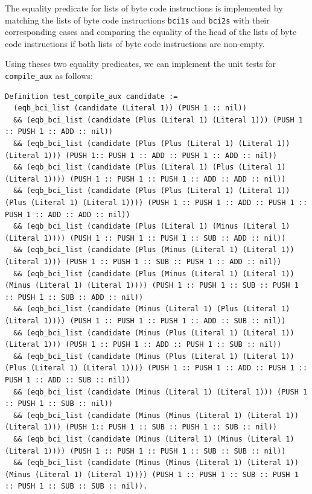 \documentclass{article}
\begin{document}
The equality predicate for lists of byte code instructions is implemented by matching the lists of byte code instructions \texttt{bci1s} and \texttt{bci2s} with their corresponding cases and comparing the equality of the head of the lists of byte code instructions if both lists of byte code instructions are non-empty.

Using theses two equality predicates, we can implement the unit tests for \texttt{compile\_aux} as follows:

\begin{lstlisting}
Definition test_compile_aux candidate :=
  (eqb_bci_list (candidate (Literal 1)) (PUSH 1 :: nil))
  && (eqb_bci_list (candidate (Plus (Literal 1) (Literal 1))) (PUSH 1 :: PUSH 1 :: ADD :: nil))
  && (eqb_bci_list (candidate (Plus (Plus (Literal 1) (Literal 1)) (Literal 1))) (PUSH 1:: PUSH 1 :: ADD :: PUSH 1 :: ADD :: nil))
  && (eqb_bci_list (candidate (Plus (Literal 1) (Plus (Literal 1) (Literal 1)))) (PUSH 1 :: PUSH 1 :: PUSH 1 :: ADD :: ADD :: nil))
  && (eqb_bci_list (candidate (Plus (Plus (Literal 1) (Literal 1)) (Plus (Literal 1) (Literal 1)))) (PUSH 1 :: PUSH 1 :: ADD :: PUSH 1 :: PUSH 1 :: ADD :: ADD :: nil))
  && (eqb_bci_list (candidate (Plus (Literal 1) (Minus (Literal 1) (Literal 1)))) (PUSH 1 :: PUSH 1 :: PUSH 1 :: SUB :: ADD :: nil))
  && (eqb_bci_list (candidate (Plus (Minus (Literal 1) (Literal 1)) (Literal 1))) (PUSH 1 :: PUSH 1 :: SUB :: PUSH 1 :: ADD :: nil))
  && (eqb_bci_list (candidate (Plus (Minus (Literal 1) (Literal 1)) (Minus (Literal 1) (Literal 1)))) (PUSH 1 :: PUSH 1 :: SUB :: PUSH 1 :: PUSH 1 :: SUB :: ADD :: nil))
  && (eqb_bci_list (candidate (Minus (Literal 1) (Plus (Literal 1) (Literal 1)))) (PUSH 1 :: PUSH 1 :: PUSH 1 :: ADD :: SUB :: nil))
  && (eqb_bci_list (candidate (Minus (Plus (Literal 1) (Literal 1)) (Literal 1))) (PUSH 1 :: PUSH 1 :: ADD :: PUSH 1 :: SUB :: nil))
  && (eqb_bci_list (candidate (Minus (Plus (Literal 1) (Literal 1)) (Plus (Literal 1) (Literal 1)))) (PUSH 1 :: PUSH 1 :: ADD :: PUSH 1 :: PUSH 1 :: ADD :: SUB :: nil))
  && (eqb_bci_list (candidate (Minus (Literal 1) (Literal 1))) (PUSH 1 :: PUSH 1 :: SUB :: nil))
  && (eqb_bci_list (candidate (Minus (Minus (Literal 1) (Literal 1)) (Literal 1))) (PUSH 1:: PUSH 1 :: SUB :: PUSH 1 :: SUB :: nil))
  && (eqb_bci_list (candidate (Minus (Literal 1) (Minus (Literal 1) (Literal 1)))) (PUSH 1 :: PUSH 1 :: PUSH 1 :: SUB :: SUB :: nil))
  && (eqb_bci_list (candidate (Minus (Minus (Literal 1) (Literal 1)) (Minus (Literal 1) (Literal 1)))) (PUSH 1 :: PUSH 1 :: SUB :: PUSH 1 :: PUSH 1 :: SUB :: SUB :: nil)).
\end{lstlisting}
\end{document}
